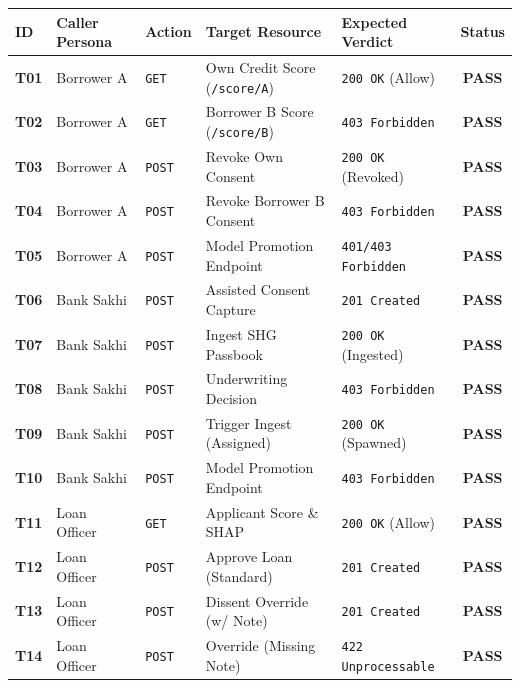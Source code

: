 \begin{table}[H]
\centering
\small
\renewcommand{\arraystretch}{1.15}
\begin{tabularx}{\textwidth}{l p{2.2cm} p{1.6cm} p{3.2cm} p{2.4cm} c}
  \toprule
  \textbf{ID} & \textbf{Caller Persona} & \textbf{Action} & \textbf{Target Resource} & \textbf{Expected Verdict} & \textbf{Status} \\
  \midrule
  \textbf{T01} & Borrower A & \texttt{GET} & Own Credit Score (\texttt{/score/A}) & \texttt{200 OK} (Allow) & \textbf{PASS} \\
  \textbf{T02} & Borrower A & \texttt{GET} & Borrower B Score (\texttt{/score/B}) & \texttt{403 Forbidden} & \textbf{PASS} \\
  \textbf{T03} & Borrower A & \texttt{POST} & Revoke Own Consent & \texttt{200 OK} (Revoked) & \textbf{PASS} \\
  \textbf{T04} & Borrower A & \texttt{POST} & Revoke Borrower B Consent & \texttt{403 Forbidden} & \textbf{PASS} \\
  \textbf{T05} & Borrower A & \texttt{POST} & Model Promotion Endpoint & \texttt{401/403 Forbidden}& \textbf{PASS} \\
  \addlinespace
  \textbf{T06} & Bank Sakhi & \texttt{POST} & Assisted Consent Capture & \texttt{201 Created} & \textbf{PASS} \\
  \textbf{T07} & Bank Sakhi & \texttt{POST} & Ingest SHG Passbook & \texttt{200 OK} (Ingested)& \textbf{PASS} \\
  \textbf{T08} & Bank Sakhi & \texttt{POST} & Underwriting Decision & \texttt{403 Forbidden} & \textbf{PASS} \\
  \textbf{T09} & Bank Sakhi & \texttt{POST} & Trigger Ingest (Assigned) & \texttt{200 OK} (Spawned) & \textbf{PASS} \\
  \textbf{T10} & Bank Sakhi & \texttt{POST} & Model Promotion Endpoint & \texttt{403 Forbidden} & \textbf{PASS} \\
  \addlinespace
  \textbf{T11} & Loan Officer & \texttt{GET} & Applicant Score \& SHAP & \texttt{200 OK} (Allow) & \textbf{PASS} \\
  \textbf{T12} & Loan Officer & \texttt{POST} & Approve Loan (Standard) & \texttt{201 Created} & \textbf{PASS} \\
  \textbf{T13} & Loan Officer & \texttt{POST} & Dissent Override (w/ Note) & \texttt{201 Created} & \textbf{PASS} \\
  \textbf{T14} & Loan Officer & \texttt{POST} & Override (Missing Note) & \texttt{422 Unprocessable} & \textbf{PASS} \\

\end{tabularx}
\end{table}
